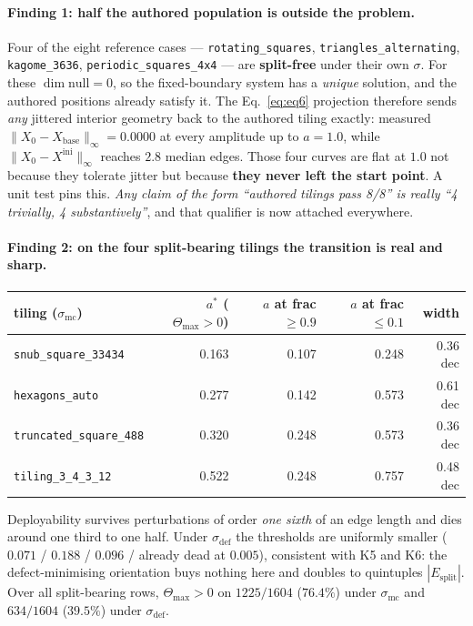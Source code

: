 \documentclass[11pt,a4paper]{article}
\theoremstyle{definition}
\newcommand{\Tmax}{\Theta_{\max}}
\newcommand{\Esplit}{E_{\mathrm{split}}}
\newcommand{\file}[1]{\texttt{\small #1}}
\begin{document}
\paragraph{Finding 1: half the authored population is outside the problem.} Four of the eight
reference cases --- \file{rotating\_squares}, \file{triangles\_alternating},
\file{kagome\_3636}, \file{periodic\_squares\_4x4} --- are \textbf{split-free} under their own
$\sigma$. For these $\dim\mathrm{null}=0$, so the fixed-boundary system has a \emph{unique}
solution, and the authored positions already satisfy it. The Eq.~\eqref{eq:eq6} projection
therefore sends \emph{any} jittered interior geometry back to the authored tiling exactly:
measured $\|X_0-X_{\mathrm{base}}\|_\infty = 0.0000$ at every amplitude up to $a=1.0$, while
$\|X_0-X^{\mathrm{ini}}\|_\infty$ reaches $2.8$ median edges. Those four curves are flat at
$1.0$ not because they tolerate jitter but because \textbf{they never left the start point}.
A unit test pins this. \emph{Any claim of the form ``authored tilings pass 8/8'' is really
``4 trivially, 4 substantively''}, and that qualifier is now attached everywhere.

\paragraph{Finding 2: on the four split-bearing tilings the transition is real and sharp.}

\begin{center}
\small
\begin{tabular}{@{}lrrrr@{}}
\toprule
tiling ($\sigma_{\mathrm{mc}}$) & $a^*$ ($\Tmax>0$) & $a$ at frac $\ge0.9$ & $a$ at frac $\le0.1$ & width \\
\midrule
\file{snub\_square\_33434} & 0.163 & 0.107 & 0.248 & 0.36 dec \\
\file{hexagons\_auto} & 0.277 & 0.142 & 0.573 & 0.61 dec \\
\file{truncated\_square\_488} & 0.320 & 0.248 & 0.573 & 0.36 dec \\
\file{tiling\_3\_4\_3\_12} & 0.522 & 0.248 & 0.757 & 0.48 dec \\
\bottomrule
\end{tabular}
\end{center}

\noindent Deployability survives perturbations of order \emph{one sixth} of an edge length and
dies around one third to one half. Under $\sigma_{\mathrm{def}}$ the thresholds are uniformly
smaller ($0.071$ / $0.188$ / $0.096$ / already dead at $0.005$), consistent with K5 and K6:
the defect-minimising orientation buys nothing here and doubles to quintuples $|\Esplit|$.
Over all split-bearing rows, $\Tmax>0$ on $1225/1604$ ($76.4\%$) under $\sigma_{\mathrm{mc}}$
and $634/1604$ ($39.5\%$) under $\sigma_{\mathrm{def}}$.
\end{document}
